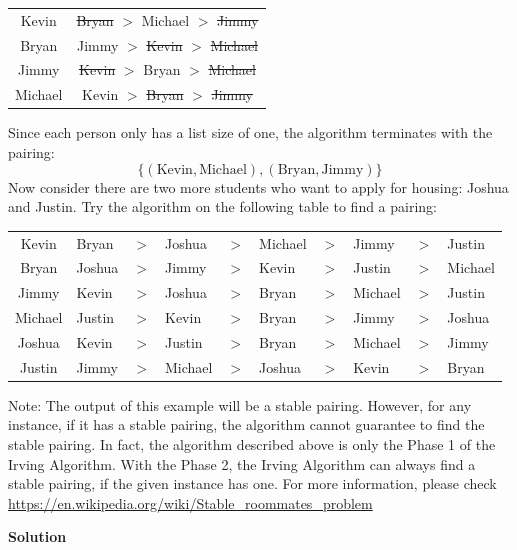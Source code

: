 \documentclass{article}
\begin{document}
\begin{center}
\begin{tabular}{ |c|c| } 
\hline
Kevin & \st{Bryan} $>$ Michael $>$ \st{Jimmy} \\
Bryan & Jimmy $>$ \st{Kevin} $>$ \st{Michael} \\
Jimmy & \st{Kevin} $>$ Bryan $>$ \st{Michael} \\
Michael & Kevin $>$ \st{Bryan} $>$ \st{Jimmy} \\
\hline
\end{tabular}
\end{center}
Since each person only has a list size of one, the algorithm terminates with the pairing: $$\{(\text{Kevin},\text{Michael}), (\text{Bryan}, \text{Jimmy})\}$$
Now consider there are two more students who want to apply for housing: Joshua and Justin. Try the algorithm on the following table to find a pairing:
\begin{center}
\begin{tabular}{ |c| l l l l l l l l l | } 
\hline
Kevin & Bryan & $>$ & Joshua & $>$ & Michael & $>$ & Jimmy & $>$ & Justin \\
Bryan & Joshua & $>$ & Jimmy & $>$ & Kevin & $>$ & Justin & $>$ & Michael \\
Jimmy & Kevin & $>$ & Joshua & $>$ & Bryan & $>$ &  Michael & $>$ & Justin \\
Michael & Justin & $>$ & Kevin & $>$ & Bryan & $>$ & Jimmy & $>$ & Joshua \\
Joshua & Kevin & $>$ & Justin & $>$ & Bryan & $>$ & Michael & $>$ & Jimmy \\
Justin & Jimmy & $>$ & Michael & $>$ & Joshua & $>$ & Kevin & $>$ & Bryan \\
\hline
\end{tabular}
\end{center}
Note: The output of this example will be a stable pairing. However, for any instance, if it has a stable pairing, the algorithm cannot guarantee to find the stable pairing. In fact, the algorithm described above is only the Phase 1 of the Irving Algorithm. With the Phase 2, the Irving Algorithm can always find a stable pairing, if the given instance has one. For more information, please check \url{https://en.wikipedia.org/wiki/Stable_roommates_problem}
\begin{mdframed}
\textbf{Solution}

\end{mdframed}

\clearpage
\end{document}
